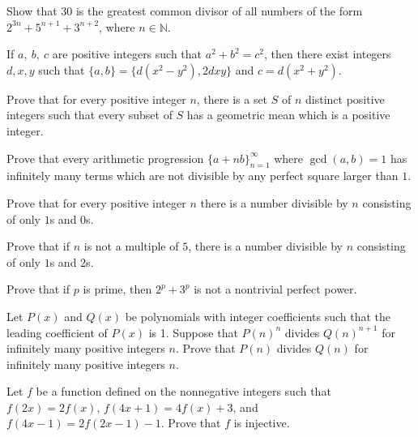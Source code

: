 \begin{problem}{\label{p:i:n:pr:55}}
  Show that $30$ is the greatest common divisor of all numbers of the form
    $2^{3n}+5^{n+1}+3^{n+2}$, where $n \in \mathbb{N}$.
\end{problem}
\begin{result}{\label{r:i:n:pr:4}}
    If $a,\ b,\ c$ are positive integers such that $a^2+b^2=c^2$, then there
    exist integers $d,x,y$ such that $\{a,b\}=\{d(x^2-y^2),2dxy\}$ and
    $c=d(x^2+y^2)$.
\end{result}
\begin{problem}{\label{p:i:n:pr:56}}
  Prove that for every positive integer $n$, there is a set $S$ of $n$
    distinct positive integers such that every subset of $S$ has a geometric
    mean which is a positive integer.
\end{problem}
\begin{problem}{\label{p:i:n:pr:57}}
    Prove that every arithmetic progression $\{a+nb\}_{n=1}^\infty$ where
    $\gcd(a,b)=1$ has infinitely many terms which are not divisible by any
    perfect square larger than $1$.
\end{problem}
\begin{problem}{\label{p:i:n:pr:58}}
    Prove that for every positive integer $n$ there is a number divisible by
    $n$ consisting of only $1$s and $0$s.
\end{problem}
\begin{problem}{\label{p:i:n:pr:58b}}
    Prove that if $n$ is not a multiple of $5$, there is a number
    divisible by $n$ consisting of only $1$s and $2$s.
\end{problem}
\begin{problem}{\label{p:i:n:pr:59}}
  Prove that if $p$ is prime, then $2^p+3^p$ is not a nontrivial perfect
    power.
\end{problem}
\begin{problem}{\label{p:i:n:pr:60}}
  Let $P(x)$ and $Q(x)$ be polynomials with integer coefficients such that the
    leading coefficient of $P(x)$ is 1. Suppose that $P(n)^n$ divides $Q(n)^{n+1}$ for infinitely
    many positive integers $n$.
    Prove that $P(n)$ divides $Q(n)$ for infinitely many positive integers $n$.
\end{problem}
\begin{problem}{\label{p:i:n:pr:61}}
  Let $f$ be a function defined on the nonnegative integers such that
    $f(2x)=2f(x)$, $f(4x+1)=4f(x)+3$, and $f(4x-1)=2f(2x-1)-1$. Prove that $f$
    is injective.
\end{problem}
